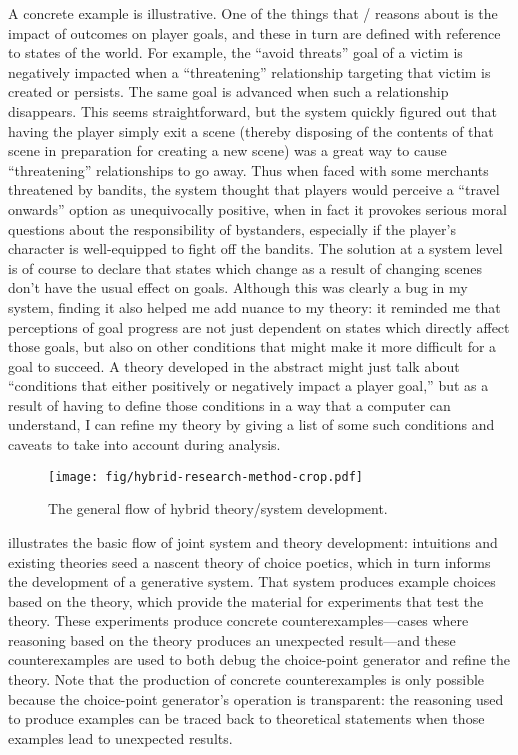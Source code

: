 A concrete example is illustrative.
%
One of the things that \dunyazad/ reasons about is the impact of outcomes on player goals, and these in turn are defined with reference to states of the world.
%
For example, the ``avoid threats'' goal of a victim is negatively impacted when a ``threatening'' relationship targeting that victim is created or persists.
%
The same goal is advanced when such a relationship disappears.
%
This seems straightforward, but the system quickly figured out that having the player simply exit a scene (thereby disposing of the contents of that scene in preparation for creating a new scene) was a great way to cause ``threatening'' relationships to go away.
%
Thus when faced with some merchants threatened by bandits, the system thought that players would perceive a ``travel onwards'' option as unequivocally positive, when in fact it provokes serious moral questions about the responsibility of bystanders, especially if the player's character is well-equipped to fight off the bandits.
%
The solution at a system level is of course to declare that states which change as a result of changing scenes don't have the usual effect on goals.
%
Although this was clearly a bug in my system, finding it also helped me add nuance to my theory: it reminded me that perceptions of goal progress are not just dependent on states which directly affect those goals, but also on other conditions that might make it more difficult for a goal to succeed.
%
A theory developed in the abstract might just talk about ``conditions that either positively or negatively impact a player goal,'' but as a result of having to define those conditions in a way that a computer can understand, I can refine my theory by giving a list of some such conditions and caveats to take into account during analysis.

\begin{figure}[!t]
\centering
\texttt{[image: fig/hybrid-research-method-crop.pdf]}
\caption[Hybrid Research Method]{The general flow of hybrid theory/system development.}
\label{fig:hybrid-research-method}
\end{figure}


 illustrates the basic flow of joint system and theory development: intuitions and existing theories seed a nascent theory of choice poetics, which in turn informs the development of a generative system.
%
That system produces example choices based on the theory, which provide the material for experiments that test the theory.
%
These experiments produce concrete counterexamples---cases where reasoning based on the theory produces an unexpected result---and these counterexamples are used to both debug the choice-point generator and refine the theory.
%
Note that the production of concrete counterexamples is only possible because the choice-point generator's operation is transparent: the reasoning used to produce examples can be traced back to theoretical statements when those examples lead to unexpected results.


